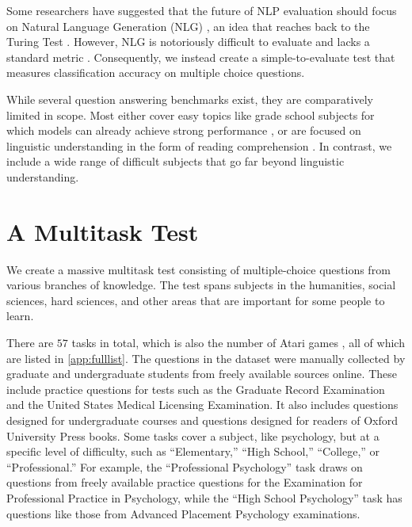 Some researchers have suggested that the future of NLP evaluation should focus on Natural Language Generation (NLG) \citep{zellers2020turingadvice}, an idea that reaches back to the Turing Test \citep{Turing1990TuringTest}. However, NLG is notoriously difficult to evaluate and lacks a standard metric \citep{Sai2020NLGSurvey}. Consequently, we instead create a simple-to-evaluate test that measures classification accuracy on multiple choice questions.

While several question answering benchmarks exist, they are comparatively limited in scope. Most either cover easy topics like grade school subjects for which models can already achieve strong performance \citep{Clark2018ARCAI2, khot2019qasc, OpenBookQA2018,Clark2019RegentsScienceExams}, or are focused on linguistic understanding in the form of reading comprehension \citep{lai2017race, richardson-etal-2013-mctest}. In contrast, we include a wide range of difficult subjects that go far beyond linguistic understanding.

\section{A Multitask Test}

We create a massive multitask test consisting of multiple-choice questions from various branches of knowledge. The test spans subjects in the humanities, social sciences, hard sciences, and other areas that are important for some people to learn. 

There are $57$ tasks in total, which is also the number of Atari games \citep{Bellemare2013Atari}, all of which are listed in \ref{app:fulllist}.
The questions in the dataset were manually collected by graduate and undergraduate students from freely available sources online. These include practice questions for tests such as the Graduate Record Examination and the United States Medical Licensing Examination. It also includes questions designed for undergraduate courses and questions designed for readers of Oxford University Press books. Some tasks cover a subject, like psychology, but at a specific level of difficulty, such as ``Elementary,'' ``High School,'' ``College,'' or ``Professional.'' For example, the ``Professional Psychology'' task draws on questions from freely available practice questions for the Examination for Professional Practice in Psychology, while the ``High School Psychology'' task has questions like those from Advanced Placement Psychology examinations.

